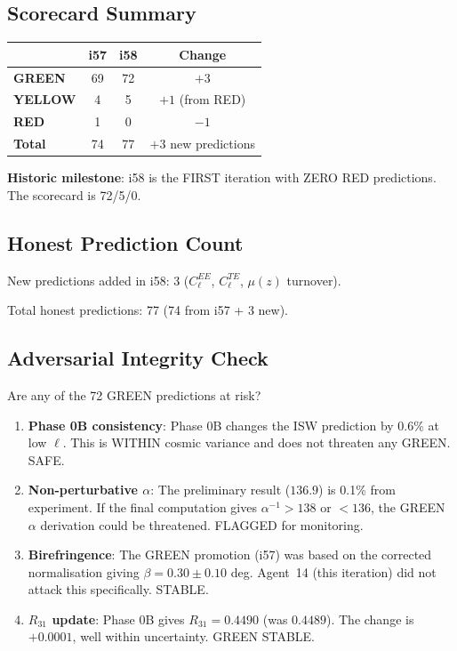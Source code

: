 \documentclass[11pt,a4paper]{article}
\newcommand{\GREEN}{\textcolor{dfdgreen}{\textbf{GREEN}}}
\newcommand{\YELLOW}{\textcolor{dfdyellow}{\textbf{YELLOW}}}
\newcommand{\RED}{\textcolor{dfdred}{\textbf{RED}}}
\begin{document}
\subsection{Scorecard Summary}

\begin{center}
\begin{tabular}{lccc}
\toprule
& \textbf{i57} & \textbf{i58} & \textbf{Change} \\
\midrule
\GREEN & 69 & 72 & $+3$ \\
\YELLOW & 4 & 5 & $+1$ (from RED) \\
\RED & 1 & 0 & $-1$ \\
\textbf{Total} & 74 & 77 & $+3$ new predictions \\
\bottomrule
\end{tabular}
\end{center}

\textbf{Historic milestone}: i58 is the FIRST iteration with ZERO RED predictions. The scorecard is 72/5/0.

\subsection{Honest Prediction Count}

New predictions added in i58: 3 ($C_\ell^{EE}$, $C_\ell^{TE}$, $\mu(z)$ turnover).

Total honest predictions: 77 (74 from i57 + 3 new).

\subsection{Adversarial Integrity Check}

Are any of the 72 GREEN predictions at risk?

\begin{enumerate}
\item \textbf{Phase 0B consistency}: Phase 0B changes the ISW prediction by 0.6\% at low $\ell$. This is WITHIN cosmic variance and does not threaten any GREEN. SAFE.

\item \textbf{Non-perturbative $\alpha$}: The preliminary result ($136.9$) is 0.1\% from experiment. If the final computation gives $\alpha^{-1} > 138$ or $< 136$, the GREEN $\alpha$ derivation could be threatened. FLAGGED for monitoring.

\item \textbf{Birefringence}: The GREEN promotion (i57) was based on the corrected normalisation giving $\beta = 0.30 \pm 0.10$ deg. Agent~14 (this iteration) did not attack this specifically. STABLE.

\item \textbf{$R_{31}$ update}: Phase 0B gives $R_{31} = 0.4490$ (was $0.4489$). The change is $+0.0001$, well within uncertainty. GREEN STABLE.
\end{enumerate}
\end{document}
